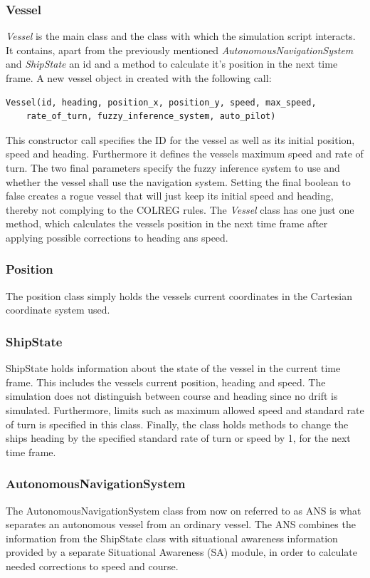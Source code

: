 \subsubsection{Vessel}
\textit{Vessel} is the main class and the class with which the simulation script interacts.
It contains, apart from the previously mentioned \textit{AutonomousNavigationSystem} and \textit{ShipState} an id and a method to calculate it's position in the next time frame.
A new vessel object in created with the following call:
\begin{verbatim}
Vessel(id, heading, position_x, position_y, speed, max_speed, 
    rate_of_turn, fuzzy_inference_system, auto_pilot)
\end{verbatim}
This constructor call specifies the ID for the vessel as well as its initial position, speed and heading. Furthermore it defines the vessels maximum speed and rate of turn. The two final parameters specify the fuzzy inference system to use and whether the vessel shall use the navigation system. Setting the final boolean to false creates a rogue vessel that will just keep its initial speed and heading, thereby not complying to the COLREG rules. The \textit{Vessel} class has one just one method, which calculates the vessels position in the next time frame after applying possible corrections to heading ans speed.
\subsubsection{Position}
The position class simply holds the vessels current coordinates in the Cartesian coordinate system used.
\subsubsection{ShipState}
ShipState holds information about the state of the vessel in the current time frame. This includes the vessels current position, heading and speed. The simulation does not distinguish between course and heading since no drift is simulated.
Furthermore, limits such as maximum allowed speed and standard rate of turn is specified in this class. Finally, the class holds methods to change the ships heading by the specified standard rate of turn or speed by 1, for the next time frame.


\subsubsection{AutonomousNavigationSystem}
The AutonomousNavigationSystem class from now on referred to as ANS is what separates an autonomous vessel from an ordinary vessel. The ANS combines the information from the ShipState class with situational awareness information provided by a separate Situational Awareness (SA) module, in order to calculate needed corrections to speed and course.

